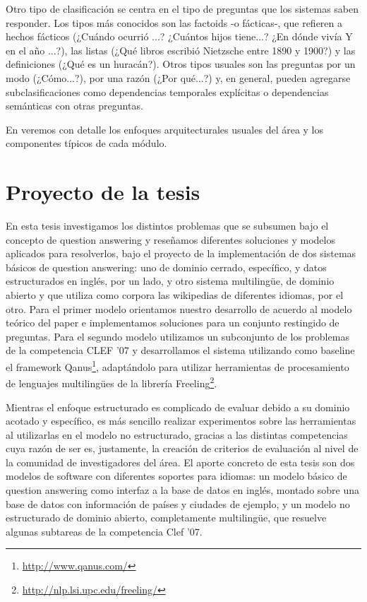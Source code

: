 Otro tipo de clasificación se centra en el tipo de preguntas que los sistemas saben responder. Los tipos más conocidos son las factoids -o fácticas-, que refieren a hechos fácticos (¿Cuándo ocurrió ...? ¿Cuántos hijos tiene...? ¿En dónde vivía Y en el año ...?), las listas (¿Qué libros escribió Nietzsche entre 1890 y 1900?) y las definiciones (¿Qué es un huracán?). Otros tipos usuales son las preguntas por un modo (¿Cómo...?), por una razón (¿Por qué...?) y, en general, pueden agregarse subclasificaciones como dependencias temporales explícitas o dependencias semánticas con otras preguntas.

En  veremos con detalle los enfoques arquitecturales usuales del área y los componentes típicos de cada módulo.

\section{Proyecto de la tesis}
\label{sec:proyecto}

En esta tesis investigamos los distintos problemas que se subsumen bajo el concepto de question answering y reseñamos diferentes soluciones y modelos aplicados para resolverlos, bajo el proyecto de la implementación de dos sistemas básicos de question answering: uno de dominio cerrado, específico, y datos estructurados en inglés, por un lado, y otro sistema multilingüe, de dominio abierto y que utiliza como corpora las wikipedias de diferentes idiomas, por el otro. Para el primer modelo orientamos nuestro desarrollo de acuerdo al modelo teórico del paper \cite{QADB1} e implementamos soluciones para un conjunto restingido de preguntas. Para el segundo modelo utilizamos un subconjunto de los problemas de la competencia CLEF '07 y desarrollamos el sistema utilizando como baseline el framework Qanus\footnote{ \url{http://www.qanus.com/}}, adaptándolo para utilizar herramientas de procesamiento de lenguajes multilingües de la librería Freeling\footnote{\url{http://nlp.lsi.upc.edu/freeling/}}.

Mientras el enfoque estructurado es complicado de evaluar debido a su dominio acotado y específico, es más sencillo realizar experimentos sobre las herramientas al utilizarlas en el modelo no estructurado, gracias a las distintas competencias cuya razón de ser es, justamente, la creación de criterios de evaluación al nivel de la comunidad de investigadores del área. El aporte concreto de esta tesis son dos modelos de software con diferentes soportes para idiomas: un modelo básico de question answering como interfaz a la base de datos en inglés, montado sobre una base de datos con información de países y ciudades de ejemplo, y un modelo no estructurado de dominio abierto, completamente multilingüe, que resuelve algunas subtareas de la competencia Clef '07.


